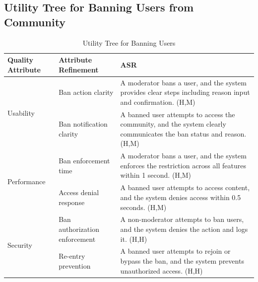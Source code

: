 \documentclass{article}
\begin{document}
\subsection{Utility Tree for Banning Users from Community}

\begin{table}[H]
    \centering
    \caption{Utility Tree for Banning Users}
    \begin{tabular}{|p{3cm}|p{4cm}|p{7cm}|}
        \hline
        \textbf{Quality Attribute} & \textbf{Attribute Refinement}                                                                                        & \textbf{ASR} \\
        \hline

        \multirow{2}{*}{Usability}
                                   & Ban action clarity
                                   & A moderator bans a user, and the system provides clear steps including reason input and confirmation. (H,M)                         \\
        \cline{2-3}
                                   & Ban notification clarity
                                   & A banned user attempts to access the community, and the system clearly communicates the ban status and reason. (H,M)                \\
        \hline

        \multirow{2}{*}{Performance}
                                   & Ban enforcement time
                                   & A moderator bans a user, and the system enforces the restriction across all features within 1 second. (H,M)                         \\
        \cline{2-3}
                                   & Access denial response
                                   & A banned user attempts to access content, and the system denies access within 0.5 seconds. (H,M)                                    \\
        \hline

        \multirow{2}{*}{Security}
                                   & Ban authorization enforcement
                                   & A non-moderator attempts to ban users, and the system denies the action and logs it. (H,H)                                          \\
        \cline{2-3}
                                   & Re-entry prevention
                                   & A banned user attempts to rejoin or bypass the ban, and the system prevents unauthorized access. (H,H)                              \\
        \hline


\end{tabular}
\end{table}
\end{document}
